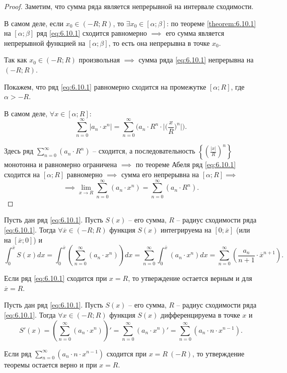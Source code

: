 \begin{proof}
    Заметим, что сумма ряда является непрерывной на интервале сходимости.

    В самом деле, если $x_0 \in (-R;R)$, то $\exists x_0 \in [\alpha;\beta]$: по теореме \ref{theorem:6.10.1} на $[\alpha;\beta]$ ряд \ref{eq:6.10.1} сходится равномерно $\implies$ его сумма является непрерывной функцией на $[\alpha;\beta]$, то есть она непрерывна в точке $x_0$.

    Так как $x_0 \in (-R;R)$ произвольная $\implies$ сумма ряда \ref{eq:6.10.1} непрерывна на $(-R;R)$.

    Покажем, что ряд \ref{eq:6.10.1} равномерно сходится на промежутке $[\alpha;R]$, где $\alpha > - R$.

    В самом деле, $\forall x \in [\alpha;R]$:
    \[
        \sum_{n=0}^{\infty}|a_n \cdot x^n| = \sum_{n=0}^{\infty}\bigg(a_n \cdot R^n \cdot \bigg|\bigg(\frac{x}{R}\bigg)^n\bigg|\bigg).
    \]

    Здесь ряд $\sum_{n=0}^{\infty}(a_n \cdot R^n)$ -- сходится, а последовательность $\left\{\left(\frac{|x|}{R}\right)^n\right\}$ монотонна и равномерно ограничена $\implies$ по теореме Абеля ряд \ref{eq:6.10.1} сходится на $[\alpha;R]$ равномерно $\implies$ сумма его непрерывна на $[\alpha;R] \implies$
    \[
        \implies\underset{x\rightarrow R}{\lim}\sum_{n=0}^{\infty}(a_n \cdot x^n) = \sum_{n=0}^{\infty} (a_n \cdot R^n).
    \]
\end{proof}

\begin{theorem}
    Пусть дан ряд \ref{eq:6.10.1}. Пусть $S(x)$ -- его сумма, $R$ -- радиус сходимости ряда \ref{eq:6.10.1}. Тогда $\forall \overline{x} \in (-R;R)$ функция $S(x)$ интегрируема на $[0;\overline{x}]$ (или на $[\overline{x};0]$) и
    \[
        \int_{0}^{\overline{x}}S(x)dx = \int_{0}^{\overline{x}}\left(\sum_{n=0}^{\infty}(a_n \cdot x^n)\right)dx = \sum_{n=0}^{\infty}\int_{0}^{\overline{x}}(a_n \cdot x^n)dx = \sum_{n=0}^{\infty} \left(\frac{a_n}{n+1}\cdot \overline{x}^{n+1}\right).
    \]

    Если ряд \ref{eq:6.10.1} сходится при $x = R$, то утверждение остается верным и для $\overline{x} = R$.
\end{theorem}

\begin{theorem}
    Пусть дан ряд \ref{eq:6.10.1}. Пусть $S(x)$ -- его сумма, $R$ -- радиус сходимости ряда \ref{eq:6.10.1}. Тогда $\forall x \in (-R;R)$ функция $S(x)$ дифференцируема в точке $x$ и
    \[
        S'(x) = \left(\sum_{n=0}^{\infty}(a_n \cdot x^n)\right)' = \sum_{n=0}^{\infty}(a_n \cdot x^n)' = \sum_{n=0}^{\infty}(a_n \cdot n \cdot x^{n-1}).
    \]

    Если ряд $\sum_{n=0}^{\infty}(a_n \cdot n \cdot x^{n-1})$ сходится при $x = R \ (-R)$, то утверждение теоремы остается верно и при $x = R$.
\end{theorem}

